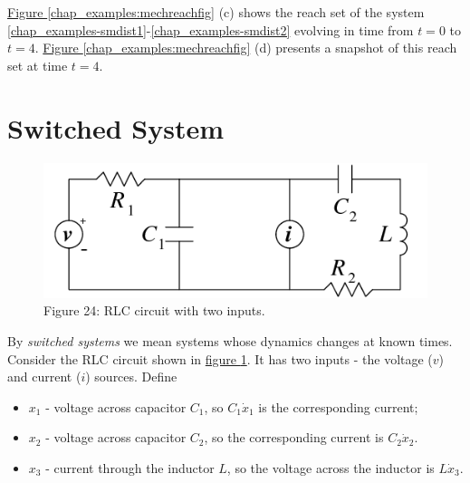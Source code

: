\documentclass[letterpaper,10pt,english]{sphinxmanual}
\begin{document}
\hyperref[chap_examples:mechreachfig]{Figure  \ref*{chap_examples:mechreachfig}} (c) shows the reach set of the system
\eqref{chap_examples-smdist1}-\eqref{chap_examples-smdist2} evolving in time from \(t=0\) to \(t=4\).
\hyperref[chap_examples:mechreachfig]{Figure  \ref*{chap_examples:mechreachfig}} (d) presents a snapshot of this reach set at time
\(t=4\).


\section{Switched System}
\label{chap_examples:switched-system}\begin{figure}[htbp]
\centering
\capstart

\includegraphics[width=0.300\linewidth]{chapter06_section03_rlc.png}
\caption{Figure 24: RLC circuit with two inputs.}\label{chap_examples:rlcfig}\end{figure}

By \emph{switched systems} we mean systems whose dynamics changes at known
times. Consider the RLC circuit shown in \hyperref[chap_examples:rlcfig]{figure  \ref*{chap_examples:rlcfig}}. It has two
inputs - the voltage (\(v\)) and current (\(i\)) sources. Define
\begin{itemize}
\item {} 
\(x_1\) - voltage across capacitor \(C_1\), so
\(C_1\dot{x}_1\) is the corresponding current;

\item {} 
\(x_2\) - voltage across capacitor \(C_2\), so the
corresponding current is \(C_2\dot{x}_2\).

\item {} 
\(x_3\) - current through the inductor \(L\), so the voltage
across the inductor is \(L\dot{x}_3\).

\end{itemize}
\end{document}
